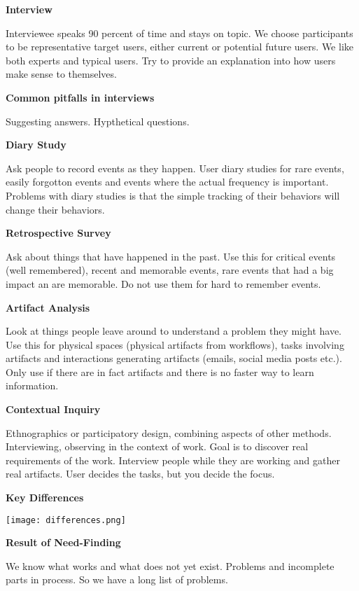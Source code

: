 \textbf{Interview}

Interviewee speaks 90 percent of time and stays on topic. We choose participants to be representative target users, either current or potential future users. We like both experts and typical users. Try to provide an explanation into how users make sense to themselves. \medskip

\textbf{Common pitfalls in interviews} \smallskip

Suggesting answers. Hypthetical questions. \medskip

\textbf{Diary Study} \smallskip

Ask people to record events as they happen. 
User diary studies for rare events, easily forgotton events and events where the actual frequency is important. 
Problems with diary studies is that the simple tracking of their behaviors will change their behaviors. \medskip

\textbf{Retrospective Survey} \smallskip

Ask about things that have happened in the past. Use this for critical events (well remembered), recent and memorable events, rare events that had a big impact an are memorable. Do not use them for hard to remember events.\medskip

\textbf{Artifact Analysis} \smallskip

Look at things people leave around to understand a problem they might have. Use this for physical spaces (physical artifacts from workflows), tasks involving artifacts and interactions generating artifacts (emails, social media posts etc.).
Only use if there are in fact artifacts and there is no faster way to learn information. \medskip

\textbf{Contextual Inquiry} \smallskip

Ethnographics or participatory design, combining aspects of other methods. Interviewing, observing in the context of work. Goal is to discover real requirements of the work.
Interview people while they are working and gather real artifacts. User decides the tasks, but you decide the focus. \medskip

\columnbreak

\textbf{Key Differences}


\begin{center}
	\texttt{[image: differences.png]}
\end{center}

\textbf{Result of Need-Finding} \smallskip

We know what works and what does not yet exist. Problems and incomplete parts in process. So we have a long list of problems. 



